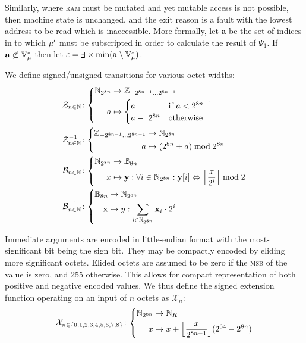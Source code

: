 Similarly, where \textsc{ram} must be mutated and yet mutable access is not possible, then machine state is unchanged, and the exit reason is a fault with the lowest address to be read which is inaccessible. More formally, let $\mathbf{a}$ be the set of indices in to which ${\mu}'$ must be subscripted in order to calculate the result of $\Psi_1$. If $\mathbf{a} \not\subset \mathbb{V}^*_{\mu}$ then let $\varepsilon=\fault \times \text{min}(\mathbf{a} \setminus \mathbb{V}^*_\mem)$.

We define signed/unsigned transitions for various octet widths:
\begin{align}
  \label{eq:signedfunc}
  \signfunc{n \in \N}&\colon\left\{\begin{aligned}
    \N_{2^{8n}} &\to \Z_{-2^{8n-1}\dots2^{8n-1}}\\
    a &\mapsto \begin{cases}
      a &\when a < 2^{8n-1} \\
      a -\ 2^{8n} &\otherwise
    \end{cases}
  \end{aligned}\right.\\
  \unsignfunc{n \in \N}&\colon\left\{\begin{aligned}
    \Z_{-2^{8n-1}\dots2^{8n-1}} &\to \N_{2^{8n}}\\
    a &\mapsto (2^{8n} + a) \bmod 2^{8n}
  \end{aligned}\right.\\
  \label{eq:bitsfunc}
  \bitsfunc{n\in\N}&\colon\left\{\begin{aligned}
    \N_{2^{8n}} &\to \mathbb{B}_{8n}\\
    x &\mapsto \mathbf{y}: \forall i \in \N_{2^{8n}} : \mathbf{y}[i] \Leftrightarrow \ffrac{x}{2^i}\bmod 2
  \end{aligned}\right.\\
  \unbitsfunc{n\in\N}&\colon\left\{\begin{aligned}
    \mathbb{B}_{8n} &\to \N_{2^{8n}}\\
    \mathbf{x} &\mapsto y: \sum_{i \in \N_{2^{8n}}} \mathbf{x}_i \cdot 2^i
  \end{aligned}\right.
\end{align}

\newcommand{\sext}{\mathcal{X}}

Immediate arguments are encoded in little-endian format with the most-significant bit being the sign bit. They may be compactly encoded by eliding more significant octets. Elided octets are assumed to be zero if the \textsc{msb} of the value is zero, and 255 otherwise. This allows for compact representation of both positive and negative encoded values. We thus define the signed extension function operating on an input of $n$ octets as $\sext_n$:
\begin{align}\label{eq:signedextension}
  \sext_{n \in \{0, 1, 2, 3, 4, 5, 6, 7, 8\}}\colon\left\{\begin{aligned}
    \N_{2^{8n}} &\to \N_R\\
    x &\mapsto x + \ffrac{x}{2^{8n-1}}(2^{64}-2^{8n})
  \end{aligned}\right.
\end{align}


